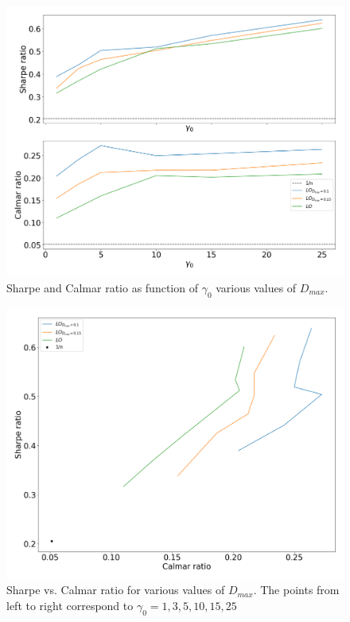 \begin{figure}[H]
    \centering
    \includegraphics[width=1\textwidth]{analysis/portfolio_exercise/images/mle/sharpe_frontier_lo.png}
    \caption[Sharpe and Calmar ratio as function of $\gamma_0$ various values of $D_{max}$]{Sharpe and Calmar ratio as function of $\gamma_0$ various values of $D_{max}$.}
    \label{fig:MPC_sharpe_frontier_lo}
\end{figure}

\begin{figure}[H]
    \centering
    \includegraphics[width=1\textwidth]{analysis/portfolio_exercise/images/mle/sharpe_calmar_lo.png}
    \caption[Sharpe vs. Calmar ratio for various values of $D_{max}$]{Sharpe vs. Calmar ratio for various values of $D_{max}$. The points from left to right correspond to $\gamma_0=1,3,5,10,15,25$}
    \label{fig:MPC_sharpe_calmar_lo}
\end{figure}

